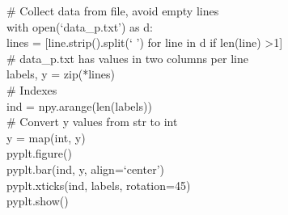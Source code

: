 \documentclass[a4paper, 12pt]{book}
\begin{document}
\noindent \# Collect data from file, avoid empty lines\\

\noindent with open(`data\_p.txt') as d:\\
  lines = [line.strip().split(` ') for line in d if len(line) \textgreater 1]\\
\noindent  \# data\_p.txt has values in two columns per line\\
  
\noindent labels, y = zip(*lines)\\

\noindent \# Indexes\\
\noindent ind = npy.arange(len(labels))\\

\noindent \# Convert y values from str to int\\
\noindent y = map(int, y)\\

\noindent pyplt.figure()\\
\noindent pyplt.bar(ind, y, align=`center')\\
\noindent pyplt.xticks(ind, labels, rotation=45)\\
\noindent pyplt.show()
\end{document}
